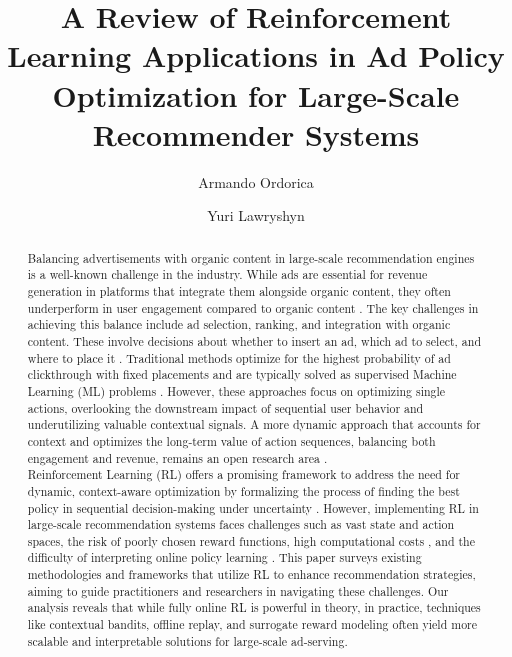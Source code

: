 \documentclass[final]{anthology-ch}         %
\title{A Review of Reinforcement Learning Applications in Ad Policy Optimization for Large-Scale Recommender Systems}
\author{Armando Ordorica}
\author{Yuri Lawryshyn}
\affiliation{University of Toronto, Toronto, Canada}
\begin{document}
\maketitle

\begin{abstract}
Balancing advertisements with organic content in large-scale recommendation engines is a well-known challenge in the industry. While ads are essential for revenue generation in platforms that integrate them alongside organic content, they often underperform in user engagement compared to organic content \cite{hochstein2023toward}. The key challenges in achieving this balance include ad selection, ranking, and integration with organic content. These involve decisions about whether to insert an ad, which ad to select, and where to place it \cite{zhao2020jointly}. Traditional methods optimize for the highest probability of ad clickthrough with fixed placements and are typically solved as supervised Machine Learning (ML) problems \cite{covington2016deep}. However, these approaches focus on optimizing single actions, overlooking the downstream impact of sequential user behavior and underutilizing valuable contextual signals. A more dynamic approach that accounts for context and optimizes the long-term value of action sequences, balancing both engagement and revenue, remains an open research area \cite{lin2023survey}.\\

Reinforcement Learning (RL) offers a promising framework to address the need for dynamic, context-aware optimization by formalizing the process of finding the best policy in sequential decision-making under uncertainty \cite{dimitrakakis2018decision}. However, implementing RL in large-scale recommendation systems faces challenges such as vast state and action spaces, the risk of poorly chosen reward functions, high computational costs \cite{pancha2022pinnerformer}, and the difficulty of interpreting online policy learning \cite{van2024practical}. This paper surveys existing methodologies and frameworks that utilize RL to enhance recommendation strategies, aiming to guide practitioners and researchers in navigating these challenges. Our analysis reveals that while fully online RL is powerful in theory, in practice, techniques like contextual bandits, offline replay, and surrogate reward modeling often yield more scalable and interpretable solutions for large-scale ad-serving.
\end{abstract}

\end{document}
